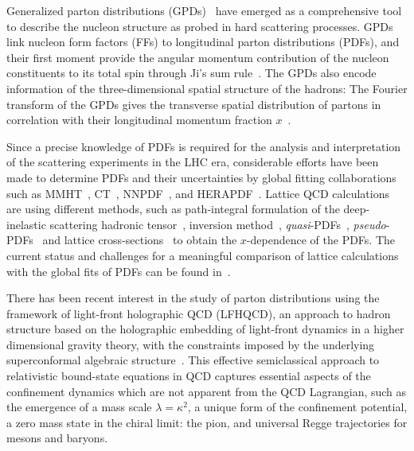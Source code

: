 \documentclass[aps,prl,reprint,groupedaddress, preprintnumbers]{revtex4-1}
\begin{document}
Generalized parton distributions (GPDs)~\cite{Mueller:1998fv, Radyushkin:1996nd, Ji:1996ek} have emerged as a comprehensive tool to describe the nucleon structure as probed in hard scattering processes. GPDs link nucleon form factors (FFs) to longitudinal parton distributions (PDFs), and their first moment provide the angular momentum contribution of the nucleon constituents to its total spin through Ji's sum rule~\cite{Ji:1996ek}. The GPDs also encode information of the three-dimensional spatial structure of the hadrons: The Fourier transform of the GPDs gives the transverse spatial distribution of partons in correlation with their longitudinal momentum fraction $x$~\cite{Burkardt:2000za}. 


Since a precise knowledge of PDFs is required for the analysis and interpretation of the scattering experiments in the LHC era, considerable efforts have been made to determine PDFs and their uncertainties by global fitting collaborations such as MMHT~\cite{Harland-Lang:2014zoa}, CT~\cite{Dulat:2015mca}, NNPDF~\cite{Ball:2017nwa}, and HERAPDF~\cite{Alekhin:2017kpj}. Lattice QCD calculations are using different methods, such as path-integral formulation of the deep-inelastic scattering hadronic tensor~\cite{Liu:1993cv,Liu:1999ak,Liang:2017mye}, inversion method~\cite{Horsley:2012pz, Chambers:2017dov}, {\it quasi}-PDFs~\cite{Ji:2013dva,Lin:2014zya,Alexandrou:2015rja,Alexandrou:2016jqi,Chen:2017lnm}, {\it pseudo}-PDFs~\cite{Radyushkin:2017cyf,Orginos:2017kos} and lattice cross-sections~\cite{Ma:2017pxb} to obtain the $x$-dependence of the PDFs. The current status and challenges for a meaningful comparison of lattice calculations with the global fits of PDFs can be found in~\cite{Lin:2017snn}.


There has been recent interest in the study of parton distributions using the framework of light-front holographic QCD (LFHQCD), an approach to hadron structure based on the holographic embedding of light-front dynamics in a higher dimensional gravity theory, with the constraints imposed by the underlying superconformal algebraic structure~\cite{Brodsky:2006uqa, deTeramond:2008ht, deTeramond:2013it, deTeramond:2014asa, Dosch:2015nwa, Brodsky:2014yha, Zou:2018eam}. This effective semiclassical approach to relativistic bound-state equations in QCD captures essential aspects of the confinement dynamics which are not apparent from the QCD Lagrangian, such as the emergence of a mass scale $\lambda = \kappa^2$, a unique form of the confinement potential, a zero mass state in the chiral limit: the pion, and universal Regge trajectories for mesons and baryons.
\end{document}
